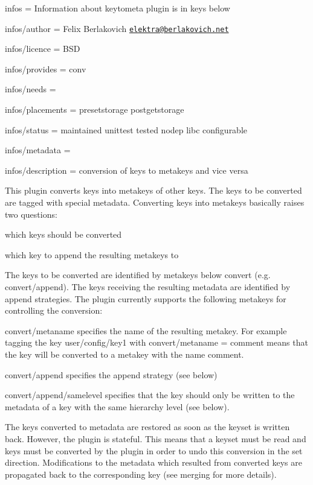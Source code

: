 
\begin{DoxyItemize}
\item infos = Information about keytometa plugin is in keys below
\item infos/author = Felix Berlakovich \href{mailto:elektra@berlakovich.net}{\tt elektra@berlakovich.\+net}
\item infos/licence = B\+SD
\item infos/provides = conv
\item infos/needs =
\item infos/placements = presetstorage postgetstorage
\item infos/status = maintained unittest tested nodep libc configurable
\item infos/metadata =
\item infos/description = conversion of keys to metakeys and vice versa
\end{DoxyItemize}

This plugin converts keys into metakeys of other keys. The keys to be converted are tagged with special metadata. Converting keys into metakeys basically raises two questions\+:
\begin{DoxyItemize}
\item which keys should be converted
\item which key to append the resulting metakeys to
\end{DoxyItemize}

The keys to be converted are identified by metakeys below {\ttfamily convert} (e.\+g. {\ttfamily convert/append}). The keys receiving the resulting metadata are identified by append strategies. The plugin currently supports the following metakeys for controlling the conversion\+:


\begin{DoxyItemize}
\item {\ttfamily convert/metaname} specifies the name of the resulting metakey. For example tagging the key {\ttfamily user/config/key1} with {\ttfamily convert/metaname = comment} means that the key will be converted to a metakey with the name {\ttfamily comment}.
\item {\ttfamily convert/append} specifies the append strategy (see below)
\item {\ttfamily convert/append/samelevel} specifies that the key should only be written to the metadata of a key with the same hierarchy level (see below).
\end{DoxyItemize}

The keys converted to metadata are restored as soon as the keyset is written back. However, the plugin is stateful. This means that a keyset must be read and keys must be converted by the plugin in order to undo this conversion in the set direction. Modifications to the metadata which resulted from converted keys are propagated back to the corresponding key (see merging for more details).

